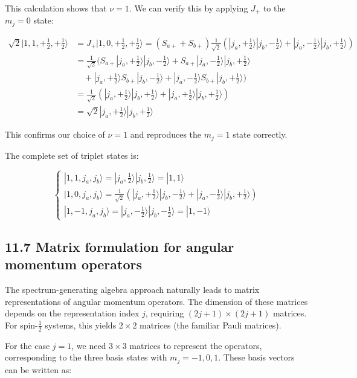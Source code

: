 \documentclass[italian]{HKNdocument}
\begin{document}
This calculation shows that $\nu=1$. We can verify this by applying $J_+$ to the $m_j=0$ state:

\begin{align*}
\sqrt{2}|1,1,+\frac{1}{2},+\frac{1}{2}\rangle &= J_{+}|1,0,+\frac{1}{2},+\frac{1}{2}\rangle=(S_{a+}+S_{b+})\frac{1}{\sqrt{2}}(|j_a,+\frac{1}{2}\rangle|j_b,-\frac{1}{2}\rangle+|j_a,-\frac{1}{2}\rangle|j_b,+\frac{1}{2}\rangle) \\
&= \frac{1}{\sqrt{2}}(S_{a+}|j_a,+\frac{1}{2}\rangle|j_b,-\frac{1}{2}\rangle+S_{a+}|j_a,-\frac{1}{2}\rangle|j_b,+\frac{1}{2}\rangle \\
&\quad +|j_a,+\frac{1}{2}\rangle S_{b+}|j_b,-\frac{1}{2}\rangle+|j_a,-\frac{1}{2}\rangle S_{b+}|j_b,+\frac{1}{2}\rangle) \\
&= \frac{1}{\sqrt{2}}(|j_a,+\frac{1}{2}\rangle|j_b,+\frac{1}{2}\rangle+|j_a,+\frac{1}{2}\rangle|j_b,+\frac{1}{2}\rangle) \\
&= \sqrt{2}|j_a,+\frac{1}{2}\rangle|j_b,+\frac{1}{2}\rangle \tag{11.67}
\end{align*}

This confirms our choice of $\nu=1$ and reproduces the $m_j=1$ state correctly.

The complete set of triplet states is:

\[
\left\{\begin{array}{l}
|1,1,j_a,j_b\rangle=|j_a,\frac{1}{2}\rangle|j_b,\frac{1}{2}\rangle=|1,1\rangle  \tag{11.68}\\
|1,0,j_a,j_b\rangle=\frac{1}{\sqrt{2}}(|j_a,+\frac{1}{2}\rangle|j_b,-\frac{1}{2}\rangle+|j_a,-\frac{1}{2}\rangle|j_b,+\frac{1}{2}\rangle) \\
|1,-1,j_a,j_b\rangle=|j_a,-\frac{1}{2}\rangle|j_b,-\frac{1}{2}\rangle=|1,-1\rangle
\end{array}\right.
\]


\subsection*{11.7 Matrix formulation for angular momentum operators}
The spectrum-generating algebra approach naturally leads to matrix representations of angular momentum operators. The dimension of these matrices depends on the representation index $j$, requiring $(2j+1)\times(2j+1)$ matrices. For spin-$\frac{1}{2}$ systems, this yields $2\times2$ matrices (the familiar Pauli matrices).

For the case $j=1$, we need $3\times3$ matrices to represent the operators, corresponding to the three basis states with $m_j=-1,0,1$. These basis vectors can be written as:
\end{document}
